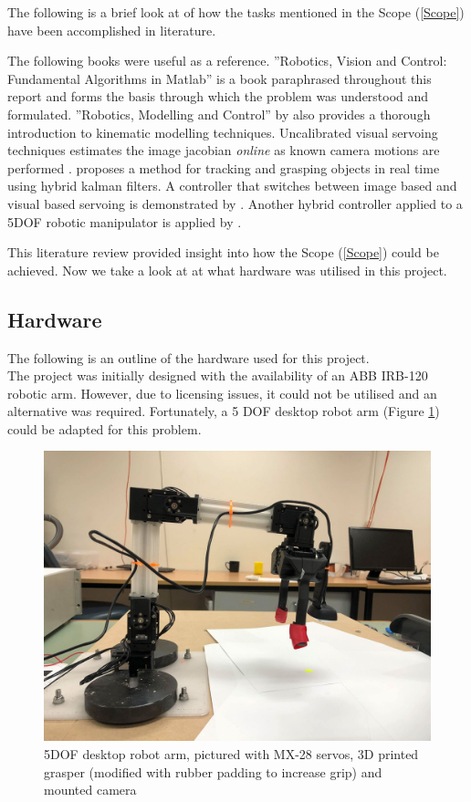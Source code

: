 \documentclass{UoNMCHA}
\numberwithin{equation}{section}
\begin{document}
    The following is a brief look at of how the tasks mentioned in the Scope (\ref{Scope}) have been accomplished in literature. 
            
    The following books were useful as a reference. ''Robotics, Vision and Control: Fundamental Algorithms in Matlab'' is a book paraphrased throughout this report and forms the basis through which the problem was understood and formulated. ''Robotics, Modelling and Control'' by \cite{siciliano2010robotics} also provides a thorough introduction to kinematic modelling techniques. Uncalibrated visual servoing techniques estimates the image jacobian \textit{online} as known camera motions are performed \citep{spratling1996uncalibrated}. \cite{nomura2000integrated} proposes a method for tracking and grasping objects in real time using hybrid kalman filters. A controller that switches between image based and visual based servoing is demonstrated by \cite{gans2007stable}. Another hybrid controller applied to a 5DOF robotic manipulator is applied by \cite{tsai2014hybrid}.
	
    This literature review provided insight into how the Scope (\ref{Scope}) could be achieved. Now we take a look at at what hardware was utilised in this project.   
    
	\subsection{Hardware}\label{Hardware}
	
	The following is an outline of the hardware used for this project. \\
	
The project was initially designed with the availability of an ABB IRB-120 robotic arm. However, due to licensing issues, it could not be utilised and an alternative was required. Fortunately, a 5 DOF desktop robot arm (Figure \ref{fig:5dofrobotarm}) could be adapted for this problem.
	
	\begin{figure}[H]
		\begin{center}
			\includegraphics[width=.5\linewidth]{Figures/5DOFarm}
			\caption{5DOF desktop robot arm, pictured with MX-28 servos, 3D printed grasper (modified with rubber padding to increase grip) and mounted camera}
					\label{fig:5dofrobotarm}
		\end{center}
	\end{figure}
	
\end{document}
